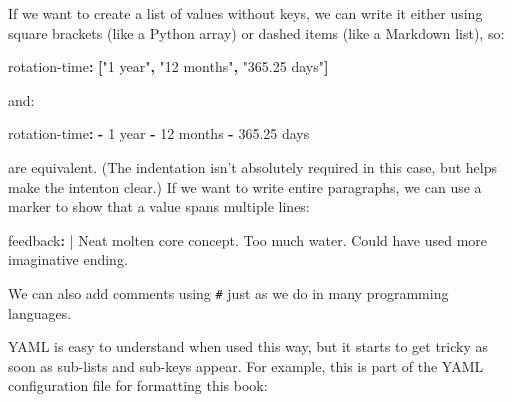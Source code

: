 \documentclass[
]{krantz}
\makeatletter
\newenvironment{Shaded}{\begin{snugshade}}{\end{snugshade}}
\newcommand{\AttributeTok}[1]{\textcolor[rgb]{0.77,0.63,0.00}{#1}}
\newcommand{\CharTok}[1]{\textcolor[rgb]{0.31,0.60,0.02}{#1}}
\newcommand{\FunctionTok}[1]{\textcolor[rgb]{0.00,0.00,0.00}{#1}}
\newcommand{\KeywordTok}[1]{\textcolor[rgb]{0.13,0.29,0.53}{\textbf{#1}}}
\newcommand{\NormalTok}[1]{#1}
\newcommand{\StringTok}[1]{\textcolor[rgb]{0.31,0.60,0.02}{#1}}
\newenvironment{kframe}{%
\medskip{}
\setlength{\fboxsep}{.8em}
 \def\at@end@of@kframe{}%
 \ifinner\ifhmode%
  \def\at@end@of@kframe{\end{minipage}}%
  \begin{minipage}{\columnwidth}%
 \fi\fi%
 \def\FrameCommand##1{\hskip\@totalleftmargin \hskip-\fboxsep
 \colorbox{shadecolor}{##1}\hskip-\fboxsep
     \hskip-\linewidth \hskip-\@totalleftmargin \hskip\columnwidth}%
 \MakeFramed {\advance\hsize-\width
   \@totalleftmargin\z@ \linewidth\hsize
   \@setminipage}}%
 {\par\unskip\endMakeFramed%
 \at@end@of@kframe}
\renewenvironment{Shaded}{\begin{kframe}}{\end{kframe}}
\makeatother
\begin{document}
If we want to create a list of values without keys,
we can write it either using square brackets (like a Python array)
or dashed items (like a Markdown list),
so:

\begin{Shaded}
\begin{Highlighting}[]
\FunctionTok{rotation{-}time}\KeywordTok{:}\AttributeTok{ }\KeywordTok{[}\StringTok{"1 year"}\KeywordTok{,}\AttributeTok{ }\StringTok{"12 months"}\KeywordTok{,}\AttributeTok{ }\StringTok{"365.25 days"}\KeywordTok{]}
\end{Highlighting}
\end{Shaded}

and:

\begin{Shaded}
\begin{Highlighting}[]
\FunctionTok{rotation{-}time}\KeywordTok{:}
\AttributeTok{    }\KeywordTok{{-}}\AttributeTok{ 1 year}
\AttributeTok{    }\KeywordTok{{-}}\AttributeTok{ 12 months}
\AttributeTok{    }\KeywordTok{{-}}\AttributeTok{ 365.25 days}
\end{Highlighting}
\end{Shaded}

are equivalent.
(The indentation isn't absolutely required in this case,
but helps make the intenton clear.)
If we want to write entire paragraphs,
we can use a marker to show that a value spans multiple lines:

\begin{Shaded}
\begin{Highlighting}[]
\FunctionTok{feedback}\KeywordTok{: }\CharTok{|}
\NormalTok{    Neat molten core concept.}
\NormalTok{    Too much water.}
\NormalTok{    Could have used more imaginative ending.}
\end{Highlighting}
\end{Shaded}

We can also add comments using \texttt{\#} just as we do in many programming languages.

YAML is easy to understand when used this way,
but it starts to get tricky as soon as sub-lists and sub-keys appear.
For example,
this is part of the YAML configuration file for formatting this book:
\end{document}
